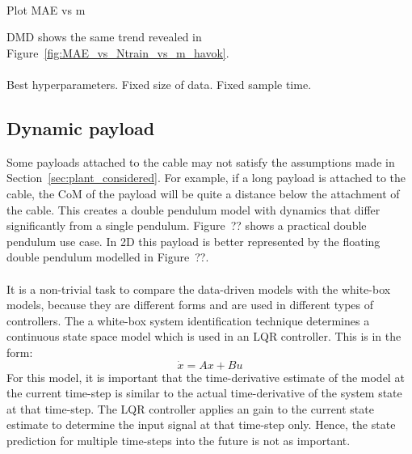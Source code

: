         \paragraph{}
        Plot MAE vs m
        
        DMD shows the same trend revealed in Figure~\ref{fig:MAE_vs_Ntrain_vs_m_havok}.

        \paragraph{}

        Best hyperparameters.
        Fixed size of data.
        Fixed sample time.

    \subsection{Dynamic payload}
        Some payloads attached to the cable may not satisfy the assumptions made in Section~\ref{sec:plant_considered}.
        For example, if a long payload is attached to the cable, the CoM of the payload will be quite a distance below the attachment of the cable.
        This creates a double pendulum model with dynamics that differ significantly from a single pendulum.
        Figure~?? shows a practical double pendulum use case. 
        In 2D this payload is better represented by the floating double pendulum modelled in Figure~??.

        
        \paragraph{}
        It is a non-trivial task to compare the data-driven models with the white-box models,
        because they are different forms and are used in different types of controllers.
        The a white-box system identification technique determines a continuous state space model 
        which is used in an LQR controller. 
        This is in the form:
        \begin{equation}
            \dot{x} = A x + B u
        \end{equation}
        For this model, it is important that the time-derivative estimate of the model 
        at the current time-step 
        is similar to the actual time-derivative of the system state at that time-step.
        The LQR controller applies an gain to the current state estimate 
        to determine the input signal at that time-step only.
        Hence, the state prediction for multiple time-steps into the future is not as important.

